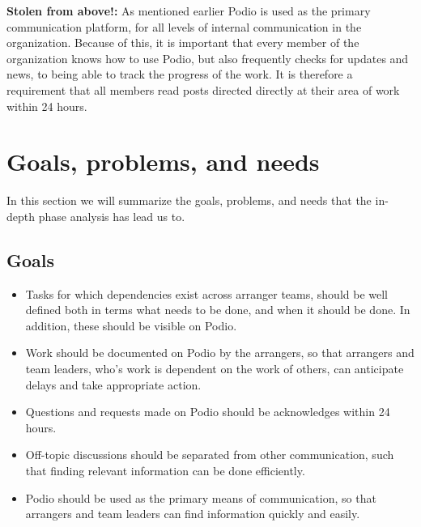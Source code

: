 \textbf{Stolen from above!:} As mentioned earlier Podio is used as the primary communication platform, for all levels of internal communication in the organization. Because of this, it is important that every member of the organization knows how to use Podio, but also frequently checks for updates and news, to being able to track the progress of the work. It is therefore a requirement that all members read posts directed directly at their area of work within 24 hours. 

\section{Goals, problems, and needs}
\label{sec:goprne}
In this section we will summarize the goals, problems, and needs that the
in-depth phase analysis has lead us to.

\subsection{Goals}
\label{subsec:goals}
\begin{itemize}
    \item Tasks for which dependencies exist across arranger teams, should be well defined both in terms what needs to be done, and when it should be done. In addition, these should be visible on Podio.
    \item Work should be documented on Podio by the arrangers, so that arrangers and team leaders, who's work is dependent on the work of others, can anticipate delays and take appropriate action.
    \item Questions and requests made on Podio should be acknowledges within 24 hours.
    \item Off-topic discussions should be separated from other communication, such that finding relevant information can be done efficiently.
    \item Podio should be used as the primary means of communication, so that arrangers and team leaders can find information quickly and easily.
\end{itemize}

